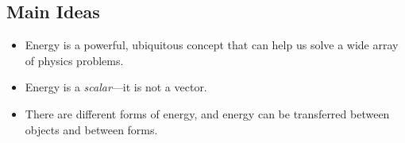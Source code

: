 \documentclass[]{article}
\begin{document}
\newpage
\begin{TeacherMargin}
	
\end{TeacherMargin}
\begin{PresentSpace}
\section*{Main Ideas}
\begin{itemize}
	\item Energy is a powerful, ubiquitous concept that can help us solve a wide array of physics problems.
	\item Energy is a \textit{scalar}---it is not a vector.
	\item There are different forms of energy, and energy can be transferred between objects and between forms.
\end{itemize}
\end{PresentSpace}
\end{document}

